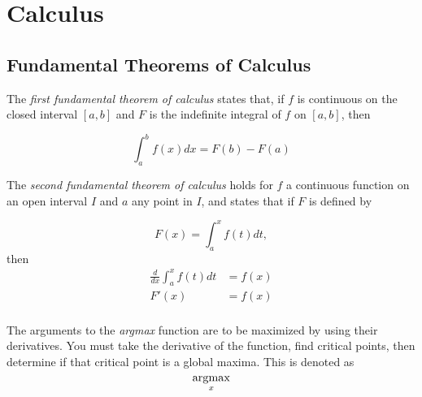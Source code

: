 \section{Calculus} \label{app:Calculus}
\subsection{Fundamental Theorems of Calculus} \label{subsec:Fundamental Theorem of Calculus}
\begin{definition} \label{def:1st Fundamental Theorem of Calculus}
  The \emph{first fundamental theorem of calculus} states that, if $f$ is continuous on the closed interval $\left[ a,b \right]$ and $F$ is the indefinite integral of $f$ on $\left[ a,b \right]$, then
  
  \begin{equation} \label{eq:1st Fundamental Theorem of Calculus}
    \int_{a}^{b}f \left( x \right) dx = F \left( b \right) - F \left( a \right)
  \end{equation}
\end{definition}

\begin{definition} \label{def:2nd Fundamental Theorem of Calculus}
  The \emph{second fundamental theorem of calculus} holds for $f$ a continuous function on an open interval $I$ and $a$ any point in $I$, and states that if $F$ is defined by

  \begin{equation*}
    F \left( x \right) = \int_{a}^{x} f \left( t \right) dt,
  \end{equation*}
  then
  \begin{equation} \label{eq:2nd Fundamental Theorem of Calculus}
    \begin{aligned}
      \frac{d}{dx} \int_{a}^{x} f \left( t \right) dt &= f \left( x \right) \\
      F' \left( x \right) &= f \left( x \right) \\
    \end{aligned}
  \end{equation}
\end{definition}
	
\begin{definition}[argmax] \label{def:argmax}
  The arguments to the \emph{argmax} function are to be maximized by using their derivatives.
  You must take the derivative of the function, find critical points, then determine if that critical point is a global maxima.
  This is denoted as
  \begin{equation*} \label{eq:argmax}
    \operatorname*{argmax}_{x}
  \end{equation*}
\end{definition}
